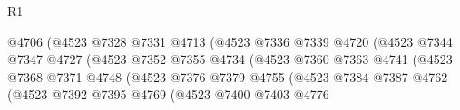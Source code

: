 \begin{lexlean}{R1}
\begin{coremodule}
                                                @4706
                                                (@4523
                                                  @7328
                                                  @7331
                                                  @4713
                                                  (@4523
                                                    @7336
                                                    @7339
                                                    @4720
                                                    (@4523
                                                      @7344
                                                      @7347
                                                      @4727
                                                      (@4523
                                                        @7352
                                                        @7355
                                                        @4734
                                                        (@4523
                                                          @7360
                                                          @7363
                                                          @4741
                                                          (@4523
                                                            @7368
                                                            @7371
                                                            @4748
                                                            (@4523
                                                              @7376
                                                              @7379
                                                              @4755
                                                              (@4523
                                                                @7384
                                                                @7387
                                                                @4762
                                                                (@4523
                                                                  @7392
                                                                  @7395
                                                                  @4769
                                                                  (@4523
                                                                    @7400
                                                                    @7403
                                                                    @4776

\end{coremodule}
\end{lexlean}
